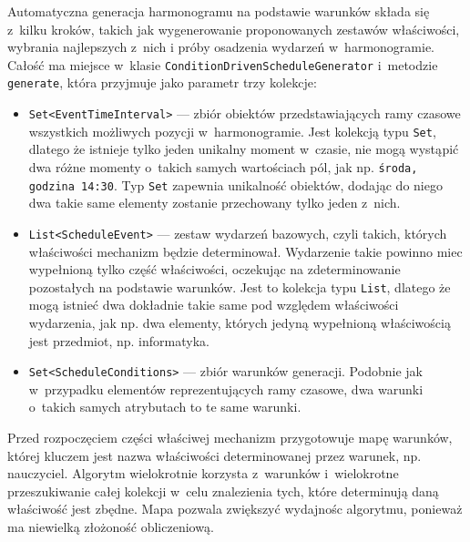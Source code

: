\documentclass[a4paper]{book}
\begin{document}
{Automatyczna generacja harmonogramu na podstawie warunków składa się z~kilku kroków, takich jak wygenerowanie proponowanych zestawów właściwości, wybrania najlepszych z~nich i próby osadzenia wydarzeń w~harmonogramie.  Całość ma miejsce w~klasie \lstinline|ConditionDrivenScheduleGenerator| i~metodzie \lstinline|generate|, która przyjmuje jako parametr trzy kolekcje:
\begin{itemize}
	\item \lstinline|Set<EventTimeInterval>| --- zbiór obiektów przedstawiających ramy czasowe wszystkich możliwych pozycji w~harmonogramie. Jest kolekcją typu \lstinline|Set|, dlatego że istnieje tylko jeden unikalny moment w~czasie, nie mogą wystąpić dwa różne momenty o~takich samych wartościach pól, jak np. \lstinline|środa, godzina 14:30|. Typ \lstinline|Set| zapewnia unikalność obiektów, dodając do niego dwa takie same elementy zostanie przechowany tylko jeden z~nich.
	\item \lstinline|List<ScheduleEvent>| --- zestaw wydarzeń bazowych, czyli takich, których właściwości mechanizm będzie determinował. Wydarzenie takie powinno miec wypełnioną tylko część właściwości, oczekując na zdeterminowanie pozostałych na podstawie warunków. Jest to kolekcja typu \lstinline|List|, dlatego że mogą istnieć dwa dokładnie takie same pod względem właściwości wydarzenia, jak np. dwa elementy, których jedyną wypełnioną właściwością jest przedmiot, np. informatyka. 
	\item \lstinline|Set<ScheduleConditions>| --- zbiór warunków generacji. Podobnie jak w~przypadku elementów reprezentujących ramy czasowe, dwa warunki o~takich samych atrybutach to te same warunki.
\end{itemize}
Przed rozpoczęciem części właściwej mechanizm przygotowuje mapę warunków, której kluczem jest nazwa właściwości determinowanej przez warunek, np. nauczyciel. Algorytm wielokrotnie korzysta z~warunków i~wielokrotne przeszukiwanie całej kolekcji w~celu znalezienia tych, które determinują daną właściwość jest zbędne. Mapa pozwala zwiększyć wydajnośc algorytmu, ponieważ ma niewielką złożoność obliczeniową.

}
\end{document}
